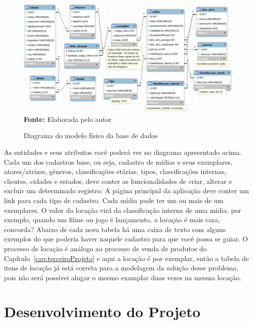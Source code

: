 \FloatBarrier
\begin{figure}[!htbp]
    \centering
    \caption{Diagrama do modelo físico da base de dados}
    \includegraphics[scale=0.45]{imagens/cap09ModeloFisico}
    \\\textbf{Fonte:} Elaborada pelo autor
    \label{fig:cap09ModeloFisico}
\end{figure}
\FloatBarrier

As entidades e seus atributos você poderá ver no diagrama apresentado acima. Cada um dos cadastros base, ou seja, cadastro de mídias e seus exemplares, atores/atrizes, gêneros, classificações etárias, tipos, classificações internas, clientes, cidades e estados, deve conter as funcionalidades de criar, alterar e excluir um determinado registro. A página principal da aplicação deve conter um link para cada tipo de cadastro. Cada mídia pode ter um ou mais de um exemplares. O valor da locação virá da classificação interna de uma mídia, por exemplo, quando um filme ou jogo é lançamento, a locação é mais cara, concorda? Abaixo de cada nova tabela há uma caixa de texto com alguns exemplos do que poderia haver naquele cadastro para que você possa se guiar. O processo de locação é análogo ao processo de venda de produtos do Capítulo~\ref{cap:terceiroProjeto} e aqui a locação é por exemplar, então a tabela de itens de locação já está correta para a modelagem da solução desse problema, pois não será possívei alugar o mesmo examplar duas vezes na mesma locação.


\section{Desenvolvimento do Projeto}

